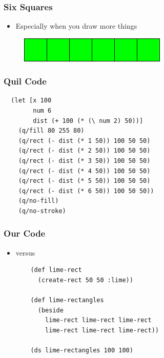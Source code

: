 \documentclass{beamer}
\begin{document}
\begin{frame}
	\frametitle{Six Squares}
	\begin{itemize}
		\item Especially when you draw more things
	\end{itemize}
		\begin{figure}[h]
			\includegraphics[width=7cm]{PresentationImages/lime-rectangles.png}
			\centering
		\end{figure}
\end{frame}

\begin{frame}[fragile]
\frametitle{Quil Code}
		\begin{verbatim}
  (let [x 100
  		num 6
  		dist (+ 100 (* (\ num 2) 50))]
	(q/fill 80 255 80)
	(q/rect (- dist (* 1 50)) 100 50 50)
	(q/rect (- dist (* 2 50)) 100 50 50)
	(q/rect (- dist (* 3 50)) 100 50 50)
	(q/rect (- dist (* 4 50)) 100 50 50)
	(q/rect (- dist (* 5 50)) 100 50 50)
	(q/rect (- dist (* 6 50)) 100 50 50))
	(q/no-fill)
	(q/no-stroke)
		\end{verbatim}	

\end{frame}

\begin{frame}[fragile]
\frametitle{Our Code}
	\begin{itemize}
		\item versus
		\begin{verbatim}
	(def lime-rect 
	  (create-rect 50 50 :lime))
	  
	(def lime-rectangles 
	  (beside 
	    lime-rect lime-rect lime-rect 
	    lime-rect lime-rect lime-rect))
	  						  
	(ds lime-rectangles 100 100)
			\end{verbatim}
	\end{itemize}
\end{frame}
\end{document}
